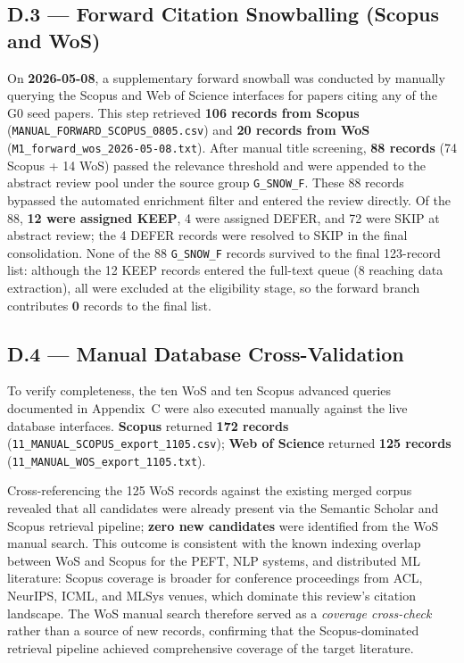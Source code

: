 \subsection*{D.3 — Forward Citation Snowballing (Scopus and WoS)}
\label{app:search_log:forward}

On \textbf{2026-05-08}, a supplementary forward snowball was conducted by manually
querying the Scopus and Web of Science interfaces for papers citing any of the G0 seed
papers. This step retrieved \textbf{106 records from Scopus}
(\texttt{MANUAL\_FORWARD\_SCOPUS\_0805.csv}) and \textbf{20 records from WoS}
(\texttt{M1\_forward\_wos\_2026-05-08.txt}). After manual title screening, \textbf{88
records} (74 Scopus + 14 WoS) passed the relevance threshold and were appended to the
abstract review pool under the source group \texttt{G\_SNOW\_F}. These 88 records
bypassed the automated enrichment filter and entered the review directly. Of the 88,
\textbf{12 were assigned KEEP}, 4 were assigned DEFER, and 72 were SKIP at abstract
review; the 4 DEFER records were resolved to SKIP in the final consolidation.
None of the 88 \texttt{G\_SNOW\_F} records survived to the final 123-record list:
although the 12 KEEP records entered the full-text queue (8 reaching data
extraction), all were excluded at the eligibility stage, so the forward branch
contributes \textbf{0} records to the final list.

\subsection*{D.4 — Manual Database Cross-Validation}
\label{app:search_log:crossval}

To verify completeness, the ten WoS and ten Scopus advanced queries documented in
Appendix~C were also executed manually against the live database interfaces.
\textbf{Scopus} returned \textbf{172 records}
(\texttt{11\_MANUAL\_SCOPUS\_export\_1105.csv}); \textbf{Web of Science} returned
\textbf{125 records} (\texttt{11\_MANUAL\_WOS\_export\_1105.txt}).

Cross-referencing the 125 WoS records against the existing merged corpus revealed that
all candidates were already present via the Semantic Scholar and Scopus retrieval
pipeline; \textbf{zero new candidates} were identified from the WoS manual search.
This outcome is consistent with the known indexing overlap between WoS and Scopus for
the PEFT, NLP systems, and distributed ML literature: Scopus coverage is broader for
conference proceedings from ACL, NeurIPS, ICML, and MLSys venues, which dominate this
review's citation landscape. The WoS manual search therefore served as a \textit{coverage
cross-check} rather than a source of new records, confirming that the Scopus-dominated
retrieval pipeline achieved comprehensive coverage of the target literature.

